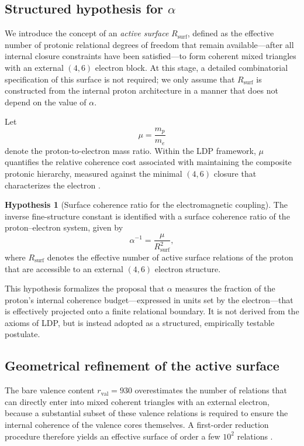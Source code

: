 \documentclass[11pt,a4paper]{article}
\theoremstyle{plain}
\theoremstyle{definition}
\newtheorem{hypothesis}{Hypothesis}
\theoremstyle{remark}
\begin{document}
\subsection{Structured hypothesis for \texorpdfstring{\(\alpha\)}{alpha}}

We introduce the concept of an \emph{active surface} \(R_{\mathrm{surf}}\), defined as the effective number of protonic relational degrees of freedom that remain available—after all internal closure constraints have been satisfied—to form coherent mixed triangles with an external \((4,6)\) electron block. At this stage, a detailed combinatorial specification of this surface is not required; we only assume that \(R_{\mathrm{surf}}\) is constructed from the internal proton architecture in a manner that does not depend on the value of \(\alpha\).

Let
\[
  \mu = \frac{m_p}{m_e}
\]
denote the proton-to-electron mass ratio. Within the LDP framework, \(\mu\) quantifies the relative coherence cost associated with maintaining the composite protonic hierarchy, measured against the minimal \((4,6)\) closure that characterizes the electron \cite{Laubscher2026PDL_English,Laubscher2026IntroPDL}.

\begin{hypothesis}[Surface coherence ratio for the electromagnetic coupling]
  \label{hyp:alpha_surface_ratio}
  The inverse fine-structure constant is identified with a surface coherence ratio of the proton–electron system, given by
  \[
    \alpha^{-1} = \frac{\mu}{R_{\mathrm{surf}}^2},
  \]
  where \(R_{\mathrm{surf}}\) denotes the effective number of active surface relations of the proton that are accessible to an external \((4,6)\) electron structure.
\end{hypothesis}

This hypothesis formalizes the proposal that \(\alpha\) measures the fraction of the proton’s internal coherence budget—expressed in units set by the electron—that is effectively projected onto a finite relational boundary. It is not derived from the axioms of LDP, but is instead adopted as a structured, empirically testable postulate.

\subsection{Geometrical refinement of the active surface}

The bare valence content \(r_{\mathrm{val}} = 930\) overestimates the number of relations that can directly enter into mixed coherent triangles with an external electron, because a substantial subset of these valence relations is required to ensure the internal coherence of the valence cores themselves. A first-order reduction procedure therefore yields an effective surface of order a few \(10^2\) relations \cite{Laubscher2026PDL_English,Laubscher2026LDP_French}.
\end{document}
